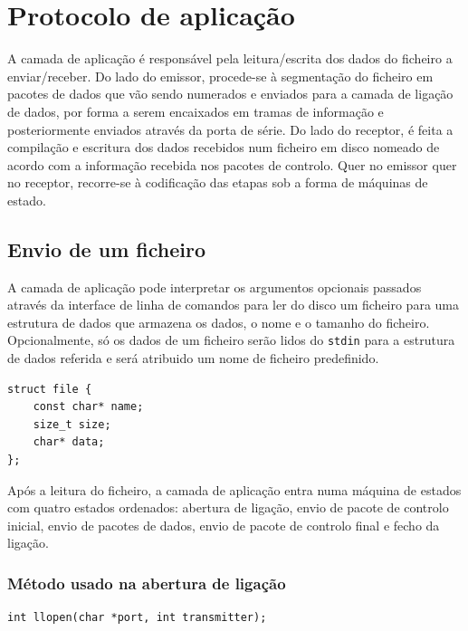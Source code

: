\documentclass[a4paper,11pt,titlepage]{article}
\begin{document}
\section{Protocolo de aplicação}

A camada de aplicação é responsável pela leitura/escrita dos dados do ficheiro a enviar/receber. Do lado do emissor, procede-se à segmentação do ficheiro em pacotes de dados que vão sendo numerados e enviados para a camada de ligação de dados, por forma a serem encaixados em tramas de informação e posteriormente enviados através da porta de série. Do lado do receptor, é feita a compilação e escritura dos dados recebidos num ficheiro em disco nomeado de acordo com a informação recebida nos pacotes de controlo. Quer no emissor quer no receptor, recorre-se à codificação das etapas sob a forma de máquinas de estado.

\subsection{Envio de um ficheiro}
A camada de aplicação pode interpretar os argumentos opcionais passados através da interface de linha de comandos para ler do disco um ficheiro para uma estrutura de dados que armazena os dados, o nome e o tamanho do ficheiro. Opcionalmente, só os dados de um ficheiro serão lidos do \texttt{stdin} para a estrutura de dados referida e será atribuido um nome de ficheiro predefinido.

\begin{lstlisting}[style=customc]
struct file {
    const char* name;
    size_t size;
    char* data;
};
\end{lstlisting}

Após a leitura do ficheiro, a camada de aplicação entra numa máquina de estados com quatro estados ordenados: abertura de ligação, envio de pacote de controlo inicial, envio de pacotes de dados, envio de pacote de controlo final e fecho da ligação.

\subsubsection*{Método usado na abertura de ligação}

\begin{lstlisting}[style=customc]
int llopen(char *port, int transmitter);
\end{lstlisting}
\end{document}
